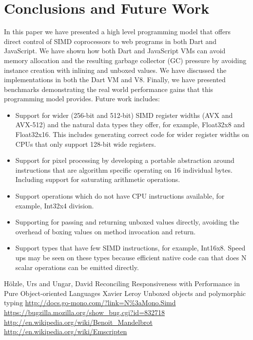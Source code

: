 \documentclass[preprint]{sigplanconf}
\begin{document}
\section{Conclusions and Future Work}
In this paper we have presented a high level programming model that offers direct control of SIMD coprocessors to web programs in both Dart and JavaScript. We have shown how both Dart and JavaScript VMs can avoid memory allocation and the resulting garbage collector (GC) pressure by avoiding instance creation with inlining and unboxed values. We have discussed the implementations in both the Dart VM and V8. Finally, we have presented benchmarks demonstrating the real world performance gains that this programming model provides. Future work includes:
\begin{itemize} 
\item Support for wider (256-bit and 512-bit) SIMD register widths (AVX and AVX-512) and the natural data types they offer, for example, Float32x8 and Float32x16. This includes generating correct code for wider register widths on CPUs that only support 128-bit wide registers.
\item Support for pixel processing by developing a portable abstraction around instructions that are algorithm specific operating on 16 individual bytes. Including support for saturating arithmetic operations.
\item Support operations which do not have CPU instructions available, for example, Int32x4 division. 
\item Supporting for passing and returning unboxed values directly, avoiding the overhead of boxing values on method invocation and return.
\item Support types that have few SIMD instructions, for example, Int16x8. Speed ups may be seen on these types because efficient native code can that does N scalar operations can be emitted directly.
\end{itemize}



\begin{thebibliography}{}
\softraggedright

H\"{o}lzle, Urs and Ungar, David Reconciling Responsiveness with Performance in Pure Object-oriented Languages
Xavier Leroy Unboxed objects and polymorphic typing
\url{http://docs.go-mono.com/?link=N\%3aMono.Simd}
\url{https://bugzilla.mozilla.org/show_bug.cgi?id=832718}
\url{http://en.wikipedia.org/wiki/Benoit_Mandelbrot}
\url{http://en.wikipedia.org/wiki/Emscripten}
\end{thebibliography}
\end{document}
